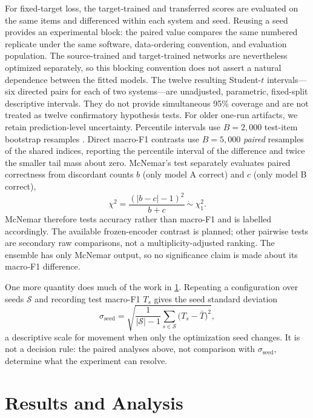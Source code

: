 \documentclass{ieeeaccess}
\begin{document}
For fixed-target loss, the target-trained and transferred scores are evaluated
on the same items and differenced within each system and seed. Reusing a seed
provides an experimental block: the paired value compares the same numbered
replicate under the same software, data-ordering convention, and evaluation
population. The source-trained and target-trained networks are nevertheless
optimized separately, so this blocking convention does not assert a natural
dependence between the fitted models. The twelve resulting Student-$t$
intervals---six directed pairs for each of two systems---are unadjusted,
parametric, fixed-split descriptive intervals. They do not provide simultaneous
95\% coverage and are not treated as twelve confirmatory hypothesis tests.
For older one-run artifacts, we retain prediction-level uncertainty. Percentile intervals use $B=2{,}000$ test-item bootstrap resamples \cite{efron1979bootstrap}. Direct macro-F1 contrasts use $B=5{,}000$ \emph{paired} resamples of the shared indices, reporting the percentile interval of the difference and twice the smaller tail mass about zero. McNemar's test \cite{mcnemar1947note} separately evaluates paired correctness from discordant counts $b$ (only model A correct) and $c$ (only model B correct),
\begin{equation}
\chi^{2}=\frac{(|b-c|-1)^2}{b+c}\ \dot{\sim}\ \chi^2_1.
\label{eq:mcnemar}
\end{equation}
McNemar therefore tests accuracy rather than macro-F1 and is labelled accordingly. The available frozen-encoder contrast is planned; other pairwise tests are secondary raw comparisons, not a multiplicity-adjusted ranking. The ensemble has only McNemar output, so no significance claim is made about its macro-F1 difference.

One more quantity does much of the work in \cref{sec:results}. Repeating a configuration over seeds $\mathcal{S}$ and recording test macro-F1 $T_s$ gives the seed standard deviation
\begin{equation}
\sigma_{\mathrm{seed}} = \sqrt{\frac{1}{|\mathcal{S}|-1}\sum_{s\in\mathcal{S}}\bigl(T_s - \bar{T}\bigr)^2},
\label{eq:seed-std}
\end{equation}
a descriptive scale for movement when only the optimization seed changes. It is not a decision rule: the paired analyses above, not comparison with $\sigma_{\mathrm{seed}}$, determine what the experiment can resolve.

\section{Results and Analysis}
\label{sec:results}
\end{document}
